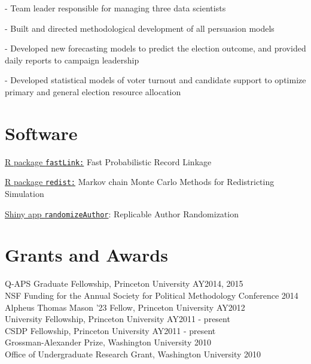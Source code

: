 \documentclass[]{deedy-resume-openfont}
\begin{document}
\begin{tightemize}
\item[-] Team leader responsible for managing three data scientists
\item[-] Built and directed methodological development of all persuasion models
\item[-] Developed new forecasting models to predict the election outcome, and provided daily reports to campaign leadership
\item[-] Developed statistical models of voter turnout and candidate support to optimize primary and general election resource allocation
\end{tightemize}
\sectionsep

\sectionsep

\section{Software}
\href{https://github.com/kosukeimai/fastLink}{R package \texttt{fastLink:}} Fast Probabilistic Record Linkage \\\vspace{2mm}

\href{https://github.com/kosukeimai/redist}{R package \texttt{redist:}} Markov chain Monte Carlo Methods for Redistricting Simulation\\\vspace{2mm}

\href{https://randomizeauthor.shinyapps.io/shiny/}{Shiny app \texttt{randomizeAuthor}}: Replicable Author Randomization
\sectionsep

\section{Grants and Awards}
Q-APS Graduate Fellowship, Princeton University \hfill AY2014, 2015\\
NSF Funding for the Annual Society for Political Methodology Conference \hfill 2014\\
Alpheus Thomas Mason '23 Fellow, Princeton University \hfill AY2012\\
University Fellowship, Princeton University \hfill AY2011 - present\\
CSDP Fellowship, Princeton University \hfill AY2011 - present\\
Grossman-Alexander Prize, Washington University \hfill 2010\\
Office of Undergraduate Research Grant, Washington University \hfill 2010
\sectionsep
\end{document}
